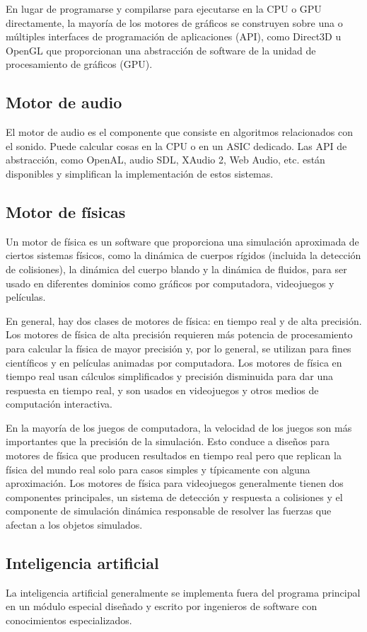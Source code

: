En lugar de programarse y compilarse para ejecutarse en la CPU o GPU directamente, la mayoría de los motores de gráficos se construyen sobre una o múltiples interfaces de programación de aplicaciones (API), como Direct3D u OpenGL que proporcionan una abstracción de software de la unidad de procesamiento de gráficos (GPU).

\subsection{Motor de audio}

El motor de audio es el componente que consiste en algoritmos relacionados con el sonido. Puede calcular cosas en la CPU o en un ASIC dedicado. Las API de abstracción, como OpenAL, audio SDL, XAudio 2, Web Audio, etc. están disponibles y simplifican la implementación de estos sistemas.

\subsection{Motor de físicas}

Un motor de física es un software que proporciona una simulación aproximada de ciertos sistemas físicos, como la dinámica de cuerpos rígidos (incluida la detección de colisiones), la dinámica del cuerpo blando y la dinámica de fluidos, para ser usado en diferentes dominios como gráficos por computadora, videojuegos y películas.

En general, hay dos clases de motores de física: en tiempo real y de alta precisión. Los motores de física de alta precisión requieren más potencia de procesamiento para calcular la física de mayor precisión y, por lo general, se utilizan para fines científicos y en películas animadas por computadora. Los motores de física en tiempo real usan cálculos simplificados y precisión disminuida para dar una respuesta en tiempo real, y son usados en videojuegos y otros medios de computación interactiva.

En la mayoría de los juegos de computadora, la velocidad de los juegos son más importantes que la precisión de la simulación. Esto conduce a diseños para motores de física que producen resultados en tiempo real pero que replican la física del mundo real solo para casos simples y típicamente con alguna aproximación. Los motores de física para videojuegos generalmente tienen dos componentes principales, un sistema de detección y respuesta a colisiones y el componente de simulación dinámica responsable de resolver las fuerzas que afectan a los objetos simulados.

\subsection{Inteligencia artificial}

La inteligencia artificial generalmente se implementa fuera del programa principal en un módulo especial diseñado y escrito por ingenieros de software con conocimientos especializados.
